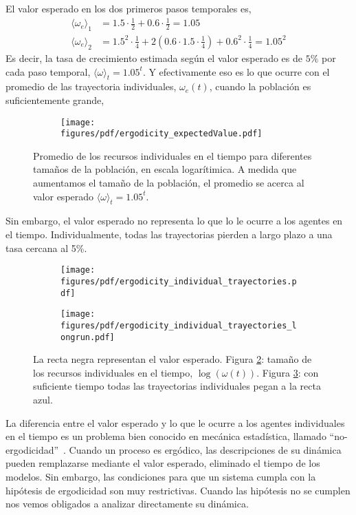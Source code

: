 \documentclass[a4paper,10pt]{article}
\begin{document}
El valor esperado en los dos primeros pasos temporales es, 
%
\begin{equation}
\begin{split}
\langle \omega_e \rangle_1 & = 1.5 \cdot \frac{1}{2} + 0.6 \cdot  \frac{1}{2} = 1.05 \\ 
\langle \omega_e \rangle_2 &=  1.5^2 \cdot \frac{1}{4} + 2 (0.6 \cdot 1.5 \cdot \frac{1}{4} ) + 0.6^2 \cdot \frac{1}{4}= 1.05^2
\end{split}
\end{equation}
%
Es decir, la tasa de crecimiento estimada según el valor esperado es de $5\%$ por cada paso temporal, $\langle \omega \rangle_t = 1.05^t$.
Y efectivamente eso es lo que ocurre con el promedio de las trayectoria individuales, $\omega_e(t)$, cuando la población es suficientemente grande,
%
\begin{figure}[H]
    \centering
    \begin{subfigure}[b]{0.45\textwidth}
    \texttt{[image: figures/pdf/ergodicity\_expectedValue.pdf]}
    \end{subfigure}
    \caption{
    Promedio de los recursos individuales en el tiempo para diferentes tamaños de la población, en escala logarítimica.
    A medida que aumentamos el tamaño de la población, el promedio se acerca al valor esperado $\langle \omega \rangle_t = 1.05^t$.
    }
    \label{fig:cpr_individual}
\end{figure}
%
Sin embargo, el valor esperado no representa lo que lo le ocurre a los agentes en el tiempo. 
Individualmente, todas las trayectorias pierden a largo plazo a una tasa cercana al 5\%.
%
\begin{figure}[H]
    \centering
    \begin{subfigure}[b]{0.45\textwidth}
    \texttt{[image: figures/pdf/ergodicity\_individual\_trayectories.pdf]}
    \caption{}
    \label{fig:ergodicity_individual_trayectories}
    \end{subfigure}
    \begin{subfigure}[b]{0.45\textwidth}
    \texttt{[image: figures/pdf/ergodicity\_individual\_trayectories\_longrun.pdf]}
    \caption{}
    \label{fig:ergodicity_individual_trayectories_longrun}
    \end{subfigure}
    \caption{
    La recta negra representan el valor esperado.
    Figura \ref{fig:ergodicity_individual_trayectories}: tamaño de los recursos individuales en el tiempo, $ \log(\omega(t))$.
    Figura \ref{fig:ergodicity_individual_trayectories_longrun}: con suficiente tiempo todas las trayectorias individuales pegan a la recta azul. 
    }
    \label{fig:cpr_individual}
\end{figure}
%
La diferencia entre el valor esperado y lo que le ocurre a los agentes individuales en el tiempo es un problema bien conocido en mecánica estadística, llamado ``no-ergodicidad''~\cite{peters2019-ergodicityEconomics}.
Cuando un proceso es ergódico, las descripciones de su dinámica pueden remplazarse mediante el valor esperado, eliminado el tiempo de los modelos.
Sin embargo, las condiciones para que un sistema cumpla con la hipótesis de ergodicidad son muy restrictivas.
Cuando las hipótesis no se cumplen nos vemos obligados a analizar directamente su dinámica. 
\end{document}
